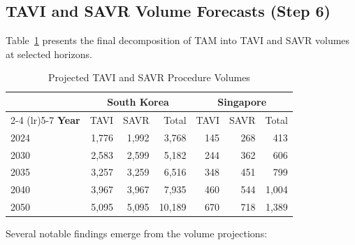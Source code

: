 \documentclass[12pt, a4paper]{article}
\begin{document}
\subsection{TAVI and SAVR Volume Forecasts (Step 6)}

Table~\ref{tab:forecasts} presents the final decomposition of TAM into TAVI and SAVR volumes at selected horizons.

\begin{table}[H]
\centering
\caption{Projected TAVI and SAVR Procedure Volumes}
\label{tab:forecasts}
\smallskip
\begin{tabular}{@{}l rrr rrr@{}}
\toprule
& \multicolumn{3}{c}{\textbf{South Korea}} & \multicolumn{3}{c}{\textbf{Singapore}} \\
\cmidrule(lr){2-4} \cmidrule(lr){5-7}
\textbf{Year} & TAVI & SAVR & Total & TAVI & SAVR & Total \\
\midrule
2024 & 1{,}776 & 1{,}992 & 3{,}768  & 145 & 268 & 413   \\
2030 & 2{,}583 & 2{,}599 & 5{,}182  & 244 & 362 & 606   \\
2035 & 3{,}257 & 3{,}259 & 6{,}516  & 348 & 451 & 799   \\
2040 & 3{,}967 & 3{,}967 & 7{,}935  & 460 & 544 & 1{,}004 \\
2050 & 5{,}095 & 5{,}095 & 10{,}189 & 670 & 718 & 1{,}389 \\
\bottomrule
\end{tabular}
\end{table}

Several notable findings emerge from the volume projections:
\end{document}

